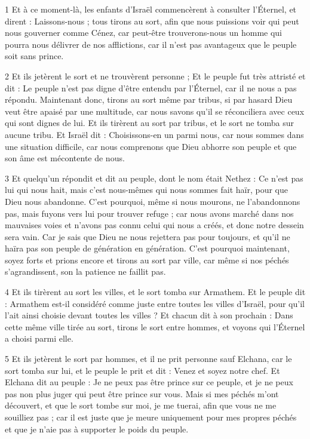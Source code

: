 \par 1 Et à ce moment-là, les enfants d'Israël commencèrent à consulter l'Éternel, et dirent : Laissons-nous ; tous tirons au sort, afin que nous puissions voir qui peut nous gouverner comme Cénez, car peut-être trouverons-nous un homme qui pourra nous délivrer de nos afflictions, car il n'est pas avantageux que le peuple soit sans prince.

\par 2 Et ils jetèrent le sort et ne trouvèrent personne ; Et le peuple fut très attristé et dit : Le peuple n'est pas digne d'être entendu par l'Éternel, car il ne nous a pas répondu. Maintenant donc, tirons au sort même par tribus, si par hasard Dieu veut être apaisé par une multitude, car nous savons qu'il se réconciliera avec ceux qui sont dignes de lui. Et ils tirèrent au sort par tribus, et le sort ne tomba sur aucune tribu. Et Israël dit : Choisissons-en un parmi nous, car nous sommes dans une situation difficile, car nous comprenons que Dieu abhorre son peuple et que son âme est mécontente de nous.

\par 3 Et quelqu'un répondit et dit au peuple, dont le nom était Nethez : Ce n'est pas lui qui nous hait, mais c'est nous-mêmes qui nous sommes fait haïr, pour que Dieu nous abandonne. C'est pourquoi, même si nous mourons, ne l'abandonnons pas, mais fuyons vers lui pour trouver refuge ; car nous avons marché dans nos mauvaises voies et n'avons pas connu celui qui nous a créés, et donc notre dessein sera vain. Car je sais que Dieu ne nous rejettera pas pour toujours, et qu'il ne haïra pas son peuple de génération en génération. C'est pourquoi maintenant, soyez forts et prions encore et tirons au sort par ville, car même si nos péchés s'agrandissent, son la patience ne faillit pas.

\par 4 Et ils tirèrent au sort les villes, et le sort tomba sur Armathem. Et le peuple dit : Armathem est-il considéré comme juste entre toutes les villes d'Israël, pour qu'il l'ait ainsi choisie devant toutes les villes ? Et chacun dit à son prochain : Dans cette même ville tirée au sort, tirons le sort entre hommes, et voyons qui l'Éternel a choisi parmi elle.

\par 5 Et ils jetèrent le sort par hommes, et il ne prit personne sauf Elchana, car le sort tomba sur lui, et le peuple le prit et dit : Venez et soyez notre chef. Et Elchana dit au peuple : Je ne peux pas être prince sur ce peuple, et je ne peux pas non plus juger qui peut être prince sur vous. Mais si mes péchés m'ont découvert, et que le sort tombe sur moi, je me tuerai, afin que vous ne me souilliez pas ; car il est juste que je meure uniquement pour mes propres péchés et que je n'aie pas à supporter le poids du peuple.

